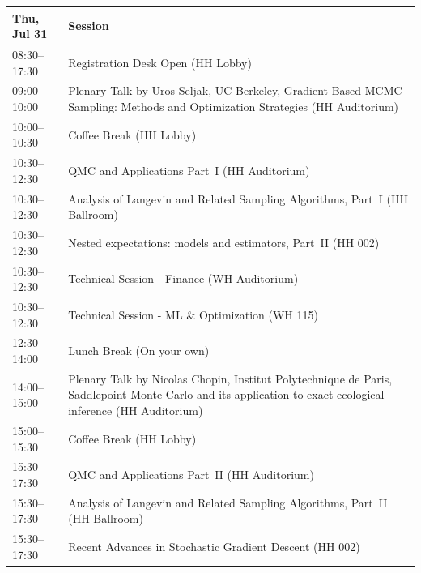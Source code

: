 \begin{table}
{\footnotesize
\begin{tabularx}{\textwidth}{>{\hsize=0.32\hsize}X|>{\hsize=1.7\hsize}X}
\hline
\textbf{Thu, Jul 31} & \textbf{Session} \\
\hline
\cellcolor{\EmptyColor}08:30--17:30 & \cellcolor{\EmptyColor}Registration Desk Open (HH Lobby) \\
\cellcolor{\PlenaryColor}09:00--10:00 & \cellcolor{\PlenaryColor}Plenary Talk by Uros Seljak, UC Berkeley, Gradient-Based MCMC Sampling: Methods and Optimization Strategies (HH Auditorium) \\
\cellcolor{\EmptyColor}10:00--10:30 & \cellcolor{\EmptyColor}Coffee Break (HH Lobby) \\
\cellcolor{\SessionTitleColor}10:30--12:30 & \cellcolor{\SessionTitleColor}QMC and Applications Part~I (HH Auditorium) \\
\cellcolor{\SessionTitleColor}10:30--12:30 & \cellcolor{\SessionTitleColor}Analysis of Langevin and Related Sampling Algorithms, Part~I (HH Ballroom) \\
\cellcolor{\SessionTitleColor}10:30--12:30 & \cellcolor{\SessionTitleColor}Nested expectations: models and estimators, Part~II (HH 002) \\
\cellcolor{\SessionLightColor}10:30--12:30 & \cellcolor{\SessionLightColor}Technical Session - Finance (WH Auditorium) \\
\cellcolor{\SessionLightColor}10:30--12:30 & \cellcolor{\SessionLightColor}Technical Session - ML \& Optimization (WH 115) \\
\cellcolor{\EmptyColor}12:30--14:00 & \cellcolor{\EmptyColor}Lunch Break (On your own) \\
\cellcolor{\PlenaryColor}14:00--15:00 & \cellcolor{\PlenaryColor}Plenary Talk by Nicolas Chopin, Institut Polytechnique de Paris, Saddlepoint Monte Carlo and its application to exact ecological inference (HH Auditorium) \\
\cellcolor{\EmptyColor}15:00--15:30 & \cellcolor{\EmptyColor}Coffee Break (HH Lobby) \\
\cellcolor{\SessionTitleColor}15:30--17:30 & \cellcolor{\SessionTitleColor}QMC and Applications Part~II (HH Auditorium) \\
\cellcolor{\SessionTitleColor}15:30--17:30 & \cellcolor{\SessionTitleColor}Analysis of Langevin and Related Sampling Algorithms, Part~II (HH Ballroom) \\
\cellcolor{\SessionTitleColor}15:30--17:30 & \cellcolor{\SessionTitleColor}Recent Advances in Stochastic Gradient Descent (HH 002) \\

\end{tabularx}}
\end{table}

